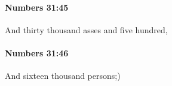 		\paragraph{Numbers 31:45} %
			\label{NUMBERS-31-45}

			And thirty thousand asses and five hundred,


		\paragraph{Numbers 31:46} %
			\label{NUMBERS-31-46}

			And sixteen thousand persons;)


